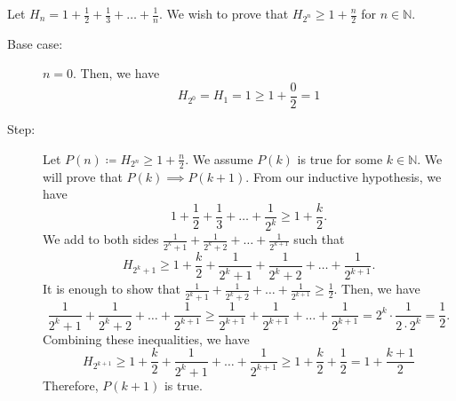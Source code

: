 \begin{eg}
	Let \( H_n = 1 + \frac{1}{2} + \frac{1}{3} + \ldots  + \frac{1}{n} \). We wish to prove that \( H_{2^n} \ge  1 + \frac{n}{2} \) for \( n \in \mathbb{N} \).
	\begin{description}
		\item[Base case:] \( n = 0 \). Then, we have \[
				H_{2^0} = H_1 = 1 \ge 1 + \frac{0}{2} = 1 
			\]
		\item[Step:] Let \( P(n) \coloneq H_{2^n} \ge 1 + \frac{n}{2} \). We assume \( P(k) \) is true for some \( k \in \mathbb{N} \). We will prove that \( P(k) \implies P(k+1) \). From our inductive hypothesis, we have \[
			1 + \frac{1}{2} + \frac{1}{3} + \ldots  + \frac{1}{2^k} \ge 1 + \frac{k}{2}
		.\] We add to both sides \(\frac{1}{2^k+1} + \frac{1}{2^k+2} + \ldots + \frac{1}{2^{k+1}}\) such that \[
			H_{2^k+1} \ge  1 + \frac{k}{2} + \frac{1}{2^k+1} + \frac{1}{2^k+2} + \ldots + \frac{1}{2^{k+1}}
		.\] It is enough to show that \( \frac{1}{2^k+1} + \frac{1}{2^k+2} + \ldots + \frac{1}{2^{k+1}} \ge \frac{1}{2} \). Then, we have \[
			\frac{1}{2^k+1} + \frac{1}{2^k+2} + \ldots + \frac{1}{2^{k+1}} \ge \frac{1}{2^{k+1}} + \frac{1}{2^{k+1}} + \ldots + \frac{1}{2^{k+1}} = 2^k \cdot  \frac{1}{2\cdot 2^k} = \frac{1}{2} 
		.\] Combining these inequalities, we have \[
			H_{2^{k+1}} \ge 1 + \frac{k}{2} + \frac{1}{2^k+1} + \ldots + \frac{1}{2^{k+1}} \ge 1 + \frac{k}{2} + \frac{1}{2} = 1 + \frac{k+1}{2} 
		\] Therefore, \( P(k+1) \) is true.
	\end{description}
\end{eg}
